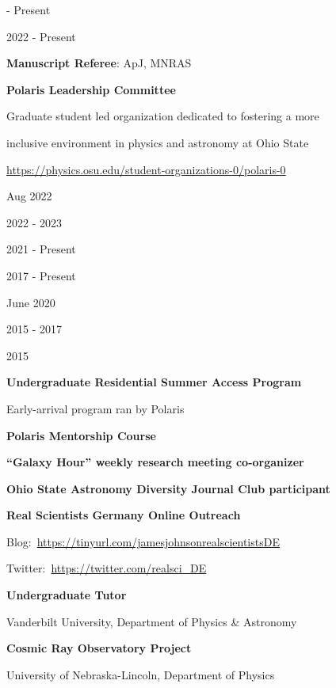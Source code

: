 \documentclass[cv.tex]{subfiles}
\begin{document}
\parbox{0.18\textwidth}{%
	 - Present \par
	2022 - Present \par
	\null \par
	\null \par
	\null \par
}
\hspace{1mm}
\parbox{0.8\textwidth}{%
	\vspace{1mm}
	\textbf{Manuscript Referee}: ApJ, MNRAS \par
	\textbf{Polaris Leadership Committee} \par
	Graduate student led organization dedicated to fostering a more \par
	inclusive environment in physics and astronomy at Ohio State \par
	\url{https://physics.osu.edu/student-organizations-0/polaris-0} \par
}

\noindent
\parbox{0.18\textwidth}{%
	\raggedleft
	Aug 2022 \par
	\null \par
	2022 - 2023 \par
	2021 - Present \par
	2017 - Present \par
	June 2020 \par
	\null \par
	\null \par
	2015 - 2017 \par
	\null \par
	2015 \par
	\null \par
}
\hspace{1mm}
\parbox{0.8\textwidth}{%
	\vspace{1mm}
	\textbf{Undergraduate Residential Summer Access Program} \par
	Early-arrival program ran by Polaris \par
	\textbf{Polaris Mentorship Course} \par
	\textbf{``Galaxy Hour'' weekly research meeting co-organizer} \par
	\textbf{Ohio State Astronomy Diversity Journal Club participant} \par
	\textbf{Real Scientists Germany Online Outreach} \par
	Blog:~\url{https://tinyurl.com/jamesjohnsonrealscientistsDE} \par
	Twitter:~\url{https://twitter.com/realsci_DE} \par
	\textbf{Undergraduate Tutor} \par
	Vanderbilt University, Department of Physics \& Astronomy \par
	\textbf{Cosmic Ray Observatory Project} \par
	University of Nebraska-Lincoln, Department of Physics \par
}
\end{document}
